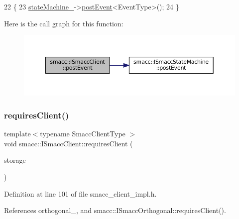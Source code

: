 \begin{DoxyCode}
22 \{
23     \hyperlink{classsmacc_1_1ISmaccClient_a926e4f2ae796def63d48dca389a48c47}{stateMachine\_}->\hyperlink{classsmacc_1_1ISmaccStateMachine_ad80cdd7bbc9a9f3b221c625754fed1ed}{postEvent}<EventType>();
24 \}
\end{DoxyCode}
Here is the call graph for this function\+:
\nopagebreak
\begin{figure}[H]
\begin{center}
\leavevmode
\includegraphics[width=350pt]{classsmacc_1_1ISmaccClient_a21a79203cb44fc717d4d977c190327c6_cgraph}
\end{center}
\end{figure}
\mbox{\label{classsmacc_1_1ISmaccClient_a7a9990a2f3e35d547671188d69fee520}} 
\subsubsection{\texorpdfstring{requires\+Client()}{requiresClient()}}
{\footnotesize\ttfamily template$<$typename Smacc\+Client\+Type $>$ \\
void smacc\+::\+I\+Smacc\+Client\+::requires\+Client (\begin{DoxyParamCaption}\item[{Smacc\+Client\+Type $\ast$\&}]{storage }\end{DoxyParamCaption})}



Definition at line 101 of file smacc\+\_\+client\+\_\+impl.\+h.



References orthogonal\+\_\+, and smacc\+::\+I\+Smacc\+Orthogonal\+::requires\+Client().


